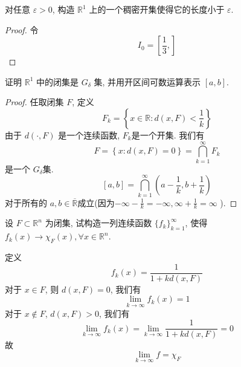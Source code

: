 \documentclass[../main.tex]{subfiles}
\begin{document}
\begin{exercise}{}{}
对任意 $\varepsilon > 0$, 构造 $\mathbb{R}^1$ 上的一个稠密开集使得它的长度小于 $\varepsilon$.
\end{exercise}
\begin{proof}
  令 \[
  I_{0}= \left[ \frac{1 }{3 },   \right] 
  \]
\end{proof}
\begin{exercise}{}{}
证明 $\mathbb{R}^1$ 中的闭集是 $G_\delta$ 集, 并用开区间可数运算表示 $[a, b]$.
\end{exercise}
\begin{proof}

    任取闭集 \(  F  \), 定义 \[
    F_{k}= \left\{ x \in \mathbb{R} : d\left( x,F \right)<  \frac{1 }{k }   \right\}
    \] 由于 \(  d\left( \cdot ,F \right)   \) 是一个连续函数,  \(  F_{k}  \)是一个开集. 我们有 \[
    F= \left\{ x: d\left( x,F \right)= 0  \right\}= \bigcap _{k= 1}^{\infty}F_{k}
    \]是一个 \(  G_{ \delta }  \)集.  
       \[
       [a,b]= \bigcap _{k= 1}^{\infty}\left( a-\frac{1 }{k },b+ \frac{1 }{k }   \right) 
       \]对于所有的 \(  a,b\in  \overline{\mathbb{R} }  \)成立(因为\(  -\infty-\frac{1 }{k }= -\infty, \infty+ \frac{1 }{k }= \infty    \) ). 
\end{proof}
\begin{exercise}{}{}
设 $F \subset \mathbb{R}^n$ 为闭集, 试构造一列连续函数 $\{f_k\}_{k=1}^\infty$, 使得 $f_k(x) \to \chi_F(x), \forall x \in \mathbb{R}^n$.
\end{exercise}
\begin{solution}
     定义 \[
     f_{k}\left( x \right)= \frac{1 }{1+ k d\left( x,F \right)  }  
     \] 对于 \(  x \in F  \), 则 \(  d\left( x,F \right)= 0   \), 我们有 \[
     \lim_{k\to \infty}f_{k}\left( x \right)= 1
     \]  对于 \(  x\not \in F  \), \(  d\left( x,F \right)> 0   \), 我们有 \[
     \lim_{k\to \infty}f_{k}\left( x \right)= \lim_{k\to \infty}\frac{1 }{1+kd\left( x,F \right)  }= 0  
     \]  故 \[
     \lim_{k\to \infty}f= \chi _{F}
     \]
\end{solution}
\end{document}
